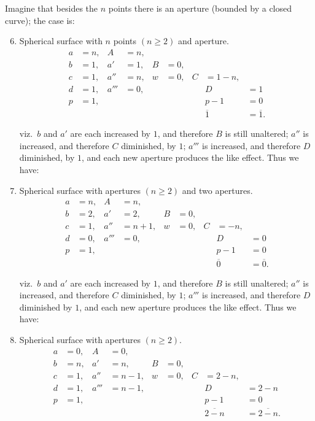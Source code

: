 \documentclass[11pt,a4paper]{article}
\theoremstyle{plain}
\theoremstyle{definition}
\begin{document}
\clearpage

Imagine that besides the $n$ points there is an aperture (bounded by a closed curve);
the case is:

\begin{enumerate}
\setcounter{enumi}{5}
\item Spherical surface with $n$ points $(n \geq 2)$ and aperture.
\begin{align*}
a &= n, & A &= n, \\
b &= 1, & a' &= 1, & B &= 0, \\
c &= 1, & a'' &= n, & w &= 0, & C &= 1 - n, \\
d &= 1, & a''' &= 0, & & & & D &= 1 \\
p &= 1, & & & & & & p - 1 &= 0 \\[2pt]
& & & & & & & \overline{1} &= \overline{1}.
\end{align*}

viz.\ $b$ and $a'$ are each increased by $1$, and therefore $B$ is still unaltered; $a''$ is increased,
and therefore $C$ diminished, by $1$; $a'''$ is increased, and therefore $D$ diminished, by $1$,
and each new aperture produces the like effect. Thus we have:

\item Spherical surface with apertures $(n \geq 2)$ and two apertures.
\begin{align*}
a &= n, & A &= n, \\
b &= 2, & a' &= 2, & B &= 0, \\
c &= 1, & a'' &= n + 1, & w &= 0, & C &= -n, \\
d &= 0, & a''' &= 0, & & & & D &= 0 \\
p &= 1, & & & & & & p - 1 &= 0 \\[2pt]
& & & & & & & \overline{0} &= \overline{0}.
\end{align*}

viz.\ $b$ and $a'$ are each increased by $1$, and therefore $B$ is still unaltered; $a''$ is increased,
and therefore $C$ diminished, by $1$; $a'''$ is increased, and therefore $D$ diminished by $1$,
and each new aperture produces the like effect. Thus we have:

\item Spherical surface with apertures $(n \geq 2)$.
\begin{align*}
a &= 0, & A &= 0, \\
b &= n, & a' &= n, & B &= 0, \\
c &= 1, & a'' &= n - 1, & w &= 0, & C &= 2 - n, \\
d &= 1, & a''' &= n - 1, & & & & D &= 2 - n \\
p &= 1, & & & & & & p - 1 &= 0 \\[2pt]
& & & & & & & \overline{2 - n} &= \overline{2 - n}.
\end{align*}


\end{enumerate}
\end{document}
